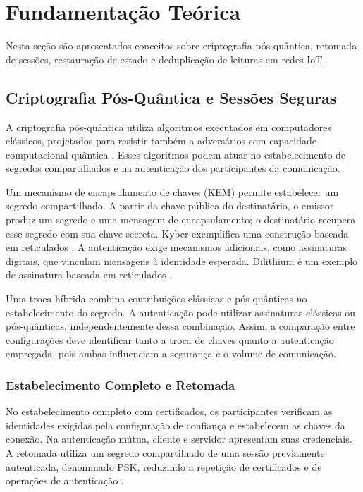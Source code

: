 \section{Fundamentação Teórica}
\label{sec:fun}

Nesta seção são apresentados conceitos sobre criptografia pós-quântica, retomada de sessões, restauração de estado e deduplicação de leituras em redes IoT.

\subsection{Criptografia Pós-Quântica e Sessões Seguras}

A criptografia pós-quântica utiliza algoritmos executados em computadores clássicos, projetados para resistir também a adversários com capacidade computacional quântica \cite{liu2024postquantum}. Esses algoritmos podem atuar no estabelecimento de segredos compartilhados e na autenticação dos participantes da comunicação.

Um mecanismo de encapsulamento de chaves (KEM) permite estabelecer um segredo compartilhado. A partir da chave pública do destinatário, o emissor produz um segredo e uma mensagem de encapsulamento; o destinatário recupera esse segredo com sua chave secreta. Kyber exemplifica uma construção baseada em reticulados \cite{bos2018kyber}. A autenticação exige mecanismos adicionais, como assinaturas digitais, que vinculam mensagens à identidade esperada. Dilithium é um exemplo de assinatura baseada em reticulados \cite{ducas2018dilithium}.

Uma troca híbrida combina contribuições clássicas e pós-quânticas no estabelecimento do segredo. A autenticação pode utilizar assinaturas clássicas ou pós-quânticas, independentemente dessa combinação. Assim, a comparação entre configurações deve identificar tanto a troca de chaves quanto a autenticação empregada, pois ambas influenciam a segurança e o volume de comunicação.

\subsubsection{Estabelecimento Completo e Retomada}

No estabelecimento completo com certificados, os participantes verificam as identidades exigidas pela configuração de confiança e estabelecem as chaves da conexão. Na autenticação mútua, cliente e servidor apresentam suas credenciais. A retomada utiliza um segredo compartilhado de uma sessão previamente autenticada, denominado PSK, reduzindo a repetição de certificados e de operações de autenticação \cite{hebrok2023tickets}.

